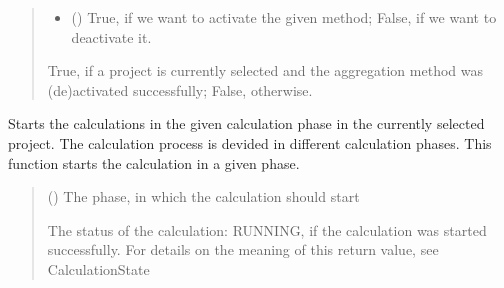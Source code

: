 \documentclass[letterpaper,10pt,english]{sphinxmanual}
\begin{document}
\begin{fulllineitems}
\begin{fulllineitems}
\begin{quote}
\begin{description}
\begin{itemize}
\item {} 
\sphinxAtStartPar
{} () \textendash{} True, if we want to activate the given method; False, if we want to deactivate it.

\end{itemize}

\sphinxAtStartPar
True, if a project is currently selected and the aggregation method was (de\sphinxhyphen{})activated successfully; False, otherwise.

\sphinxAtStartPar
{}

\end{description}\end{quote}

\end{fulllineitems}


\begin{fulllineitems}
\label{\detokenize{apidoc/src.osm_configurator.control:src.osm_configurator.control.control.Control.start_calculations}}
\pysigstartsignatures
{}
\pysigstopsignatures
\sphinxAtStartPar
Starts the calculations in the given calculation phase in the currently selected project.
The calculation process is devided in different calculation phases. This function starts the calculation in a given phase.
\begin{quote}\begin{description}
\sphinxAtStartPar
{} ({\hyperref[\detokenize{apidoc/src.osm_configurator.model.project.calculation:src.osm_configurator.model.project.calculation.calculation_phase_enum.CalculationPhase}]{}}) \textendash{} The phase, in which the calculation should start

\sphinxAtStartPar
The status of the calculation: RUNNING, if the calculation was started successfully. For details on the meaning of this return value, see CalculationState


\end{description}
\end{quote}
\end{fulllineitems}
\end{fulllineitems}
\end{document}

